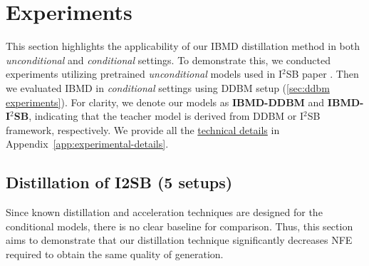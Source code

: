 



\vspace{-2mm}
\section{Experiments}\label{sec:experiments}
\vspace{-2mm}
This section highlights the applicability of our IBMD distillation method in both \textit{unconditional} and \textit{conditional} settings. To demonstrate this, we conducted experiments utilizing pretrained \textit{unconditional} models used in I$^2$SB paper \citep{liu20232}. Then we evaluated IBMD in \textit{conditional} settings using DDBM \citep{zhou2024denoising} setup (\wasyparagraph\ref{sec:ddbm experiments}). For clarity, we denote our models as \textbf{IBMD-DDBM} and \textbf{IBMD-I$^2$SB}, indicating that the teacher model is derived from DDBM or I$^2$SB framework, respectively. 
We provide all the \underline{technical details} in Appendix~\ref{app:experimental-details}.


\vspace{-2mm}
\subsection{Distillation of I2SB (5 setups)}\label{sec:i2sb experiments}
\vspace{-2mm}
Since known distillation and acceleration techniques are designed for the conditional models, there is no clear baseline for comparison. Thus, this section aims to demonstrate that our distillation technique significantly decreases NFE required to obtain the same quality of generation.

